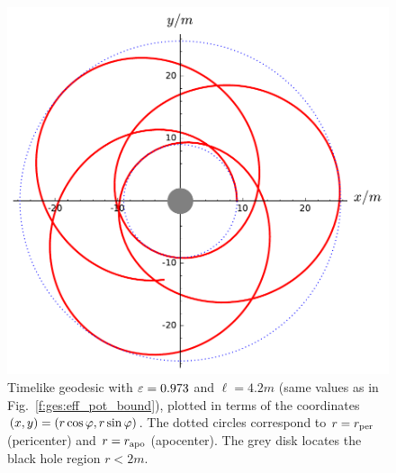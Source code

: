 \begin{figure}
\centerline{\includegraphics[height=0.4\textheight]{ges_orbit_e973_l42.pdf}}
\caption[]{\label{f:ges:orbit_e973_l42} \footnotesize
Timelike geodesic with $\varepsilon = 0.973$ and $\ell=4.2m$ (same values as in
Fig.~\ref{f:ges:eff_pot_bound}), plotted in terms of the coordinates
$(x,y) = (r\cos\varphi, r\sin\varphi)$. The dotted circles correspond to $r=r_{\rm per}$
(pericenter) and $r=r_{\rm apo}$ (apocenter). The grey disk locates the
black hole region $r<2m$.
}
\end{figure}

